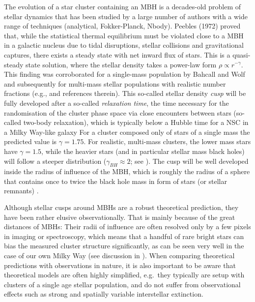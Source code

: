 \documentclass[a4paper]{jpconf}
\begin{document}
The evolution of a star cluster containing an MBH is a decades-old
problem of stellar dynamics that has been studied by a large number of
authors with a wide range of techniques (analytical, Fokker-Planck,
Nbody). Peebles (1972) \cite{Peebles:1972fk} proved that, while the
statistical thermal equilibrium must be violated close to a MBH in a
galactic nucleus due to tidal disruptions, stellar collisions and
gravitational captures, there exists a steady state with net inward
flux of stars.  This is a quasi-steady state solution,
where the stellar density takes a power-law form
$\rho \propto r^{-\gamma}$. This finding was corroborated for a
single-mass population by Bahcall and Wolf \cite{Bahcall:1976vn} and
subsequently for multi-mass stellar populations with realistic number
fractions (e.g.,
\cite{Bahcall:1977ys,Lightman:1977ly,Murphy:1991zr,Amaro-Seoane:2004kx,Alexander:2005fk,Merritt:2006ys,Alexander:2009gd,Amaro-Seoane:2011qv}
and references therein). This so-called stellar density {\it cusp}
will be fully developed after a so-called {\it relaxation time}, the
time necessary for the randomisation of the cluster phase space via
close encounters between stars (so-called two-body relaxation), which
is typically below a Hubble time for a NSC in a Milky Way-like galaxy
For a cluster composed only of stars of a single mass the predicted
value is $\gamma=1.75$. For realistic, multi-mass clusters, the lower
mass stars have $\gamma=1.5$, while the heavier stars (and in
particular stellar mass black holes) will follow a steeper
distribution ($\gamma_{BH}\approx2$; see
\cite{Alexander:2009gd,Amaro-Seoane:2011qv}). The cusp will be well
developed inside the radius of influence of the MBH, which is roughly
the radius of a sphere that contains once to twice the black hole mass
in form of stars (or stellar remnants) \cite{Alexander:2005fk}.

Although stellar cusps around MBHs are a robust theoretical
prediction, they have been rather elusive observationally. That is
mainly because of the great distances of MBHs: Their radii of
influence are often resolved only by a few pixels in imaging or
spectroscopy, which means that a handful of rare bright stars can bias
the measured cluster structure significantly, as can be seen very well
in the case of our own Milky Way (see discussion in
\cite{Schodel:2007tw}). When comparing theoretical predictions with
observations in nature, it is also important to be aware that
theoretical models are often highly simplified, e.g.\ they typically
are setup with clusters of a single age stellar population, and do not
suffer from observational effects such as strong and spatially
variable interstellar extinction.
\end{document}
